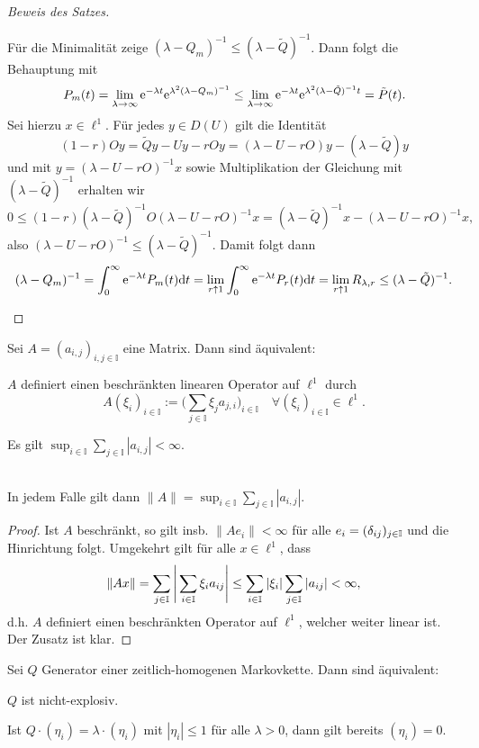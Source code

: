 \documentclass[a4paper]{paper}
\numberwithin{equation}{satz}
\begin{document}
\begin{proof}[Beweis des Satzes]
\begin{compactenum}
  \par Für die Minimalität zeige $(\lambda - Q_m)^{-1}\leq (\lambda-\tilde Q)^{-1}$. Dann folgt die Behauptung mit
  $$P_m(t)=\lim_{\lambda\to\infty}\text e^{-\lambda t}\text e^{\lambda^2 (\lambda - Q_m)^{-1}}\leq\lim_{\lambda\to\infty}\text e^{-\lambda t}\text e^{\lambda^2(\lambda -\tilde Q)^{-1}t}=\tilde P(t).$$
  Sei hierzu $x\in\ell^1$. Für jedes $y\in D(U)$ gilt die Identität $$(1-r)Oy = \tilde Qy - Uy-rOy=(\lambda - U - rO)y-(\lambda - \tilde Q)y$$ und mit $y=(\lambda - U -rO)^{-1}x$ sowie Multiplikation der Gleichung mit $(\lambda-\tilde Q)^{-1}$ erhalten wir $$0\leq(1-r)(\lambda-\tilde Q)^{-1} O(\lambda - U-rO)^{-1}x=(\lambda- \tilde Q)^{-1}x-(\lambda- U-rO)^{-1}x,$$
  also $(\lambda-U-rO)^{-1}\leq (\lambda -\tilde Q)^{-1}$. Damit folgt  dann$$(\lambda-Q_m)^{-1}=\int_0^\infty \text e^{-\lambda t}P_m(t)\text dt = \lim_{r\uparrow 1}\int_0^\infty \text e^{-\lambda t}P_r(t)\text dt=\lim_{r\uparrow 1} R_{\lambda, r}\leq (\lambda- \tilde Q)^{-1}.$$
  \end{compactenum}
\end{proof}



\begin{prop}
  Sei $A=(a_{i,j})_{i,j\in\mathbb I}$ eine Matrix. Dann sind äquivalent:
  \begin{compactenum}
      \item $A$ definiert einen beschränkten linearen Operator auf $\ell^1$ durch  $$A(\xi_i)_{i\in \mathbb I}:=\Bigg(\sum_{j\in\mathbb I}\xi_j a_{j,i}\Bigg)_{i\in\mathbb I}\quad \forall (\xi_i)_{i\in\mathbb I}\in\ell^1.$$
      \item Es gilt $\sup_{i\in\mathbb I}\sum_{j\in\mathbb I}|a_{i,j}|<\infty$.
\end{compactenum}~\\
  In jedem Falle gilt dann $\|A\|=\sup_{i\in\mathbb I}\sum_{j\in\mathbb I}|a_{i,j}|$.
\end{prop}

\begin{proof}
Ist $A$ beschränkt, so gilt insb. $\|Ae_i\|<\infty$ für alle $e_i=(\delta_{ij})_{j\in \mathbb{I}}$ und die Hinrichtung folgt. Umgekehrt gilt für alle $x\in \ell^1$, dass
$$\|Ax\|=\sum_{j\in\mathbb{I}}\Bigg|\sum_{i\in\mathbb{I}}\xi_i a_{ij}\Bigg|\leq\sum_{i\in\mathbb{I}}|\xi_i|\sum_{j\in\mathbb{I}}|a_{ij}|<\infty,$$ d.h. $A$ definiert einen beschränkten Operator auf $\ell^1$, welcher weiter linear ist. Der Zusatz ist klar.
\end{proof}

\begin{prop}
  Sei $Q$ Generator einer zeitlich-homogenen Markovkette. Dann sind äquivalent:
  \begin{compactenum}
      \item $Q$ ist nicht-explosiv.
      \item Ist $Q\cdot(\eta_i)=\lambda \cdot(\eta_i)$ mit $|\eta_i|\leq 1$ für alle $\lambda>0$, dann gilt bereits $(\eta_i)=0$.
  \end{compactenum}
\end{prop}
\end{document}
